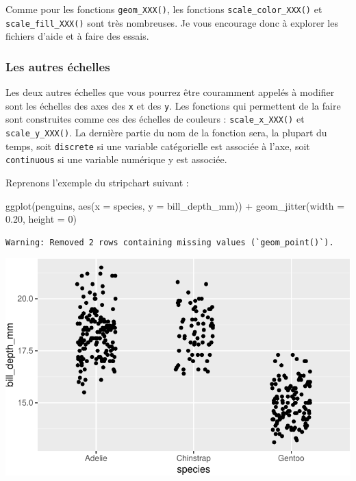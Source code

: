 \documentclass[
  a4paper,
  DIV=11,
  numbers=noendperiod,
  oneside]{scrreprt}
\newenvironment{Shaded}{}{}
\newcommand{\AttributeTok}[1]{\textcolor[rgb]{0.84,0.23,0.29}{#1}}
\newcommand{\DecValTok}[1]{\textcolor[rgb]{0.00,0.36,0.77}{#1}}
\newcommand{\FloatTok}[1]{\textcolor[rgb]{0.00,0.36,0.77}{#1}}
\newcommand{\FunctionTok}[1]{\textcolor[rgb]{0.44,0.26,0.76}{#1}}
\newcommand{\NormalTok}[1]{\textcolor[rgb]{0.14,0.16,0.18}{#1}}
\newcommand{\SpecialCharTok}[1]{\textcolor[rgb]{0.00,0.36,0.77}{#1}}
\begin{document}
Comme pour les fonctions \texttt{geom\_XXX()}, les fonctions
\texttt{scale\_color\_XXX()} et \texttt{scale\_fill\_XXX()} sont très
nombreuses. Je vous encourage donc à explorer les fichiers d'aide et à
faire des essais.

\subsubsection{Les autres échelles}\label{les-autres-uxe9chelles}

Les deux autres échelles que vous pourrez être couramment appelés à
modifier sont les échelles des axes des \texttt{x} et des \texttt{y}.
Les fonctions qui permettent de la faire sont construites comme ces des
échelles de couleurs : \texttt{scale\_x\_XXX()} et
\texttt{scale\_y\_XXX()}. La dernière partie du nom de la fonction sera,
la plupart du temps, soit \texttt{discrete} si une variable catégorielle
est associée à l'axe, soit \texttt{continuous} si une variable numérique
y est associée.

Reprenons l'exemple du stripchart suivant :

\begin{Shaded}
\begin{Highlighting}[]
\FunctionTok{ggplot}\NormalTok{(penguins, }\FunctionTok{aes}\NormalTok{(}\AttributeTok{x =}\NormalTok{ species, }\AttributeTok{y =}\NormalTok{ bill\_depth\_mm)) }\SpecialCharTok{+}
  \FunctionTok{geom\_jitter}\NormalTok{(}\AttributeTok{width =} \FloatTok{0.20}\NormalTok{, }\AttributeTok{height =} \DecValTok{0}\NormalTok{)}
\end{Highlighting}
\end{Shaded}

\begin{verbatim}
Warning: Removed 2 rows containing missing values (`geom_point()`).
\end{verbatim}

\includegraphics{03-visualization_files/figure-pdf/unnamed-chunk-103-1.pdf}
\end{document}
